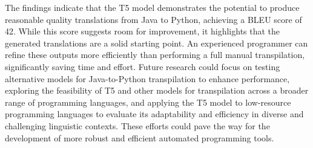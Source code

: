 \documentclass{dhbenelux}
\begin{document}
The findings indicate that the T5 model demonstrates the potential to produce reasonable quality translations from Java to Python, achieving a BLEU score of 42. While this score suggests room for improvement, it highlights that the generated translations are a solid starting point. An experienced programmer can refine these outputs more efficiently than performing a full manual transpilation, significantly saving time and effort. Future research could focus on testing alternative models for Java-to-Python transpilation to enhance performance, exploring the feasibility of T5 and other models for transpilation across a broader range of programming languages, and applying the T5 model to low-resource programming languages to evaluate its adaptability and efficiency in diverse and challenging linguistic contexts. These efforts could pave the way for the development of more robust and efficient automated programming tools.

\clearpage



\end{document}
